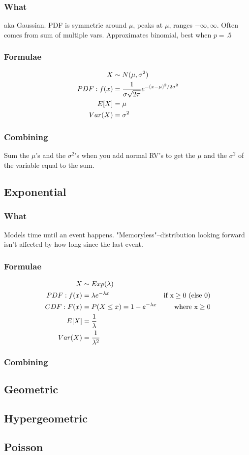 \documentclass[12pt]{amsart}
\begin{document}
\subsubsection{What}
aka Gaussian. PDF is symmetric around $\mu$, peaks at $\mu$, ranges $-\infty, \infty$. Often comes from sum of multiple vars. Approximates binomial, best when $p = .5$
\subsubsection{Formulae}
\begin{align*}
X &\sim N(\mu, \sigma^2) \\
PDF: f(x) &= {1 \over \sigma \sqrt{2\pi}} e^{-(x-\mu)^2 / 2 \sigma^2} \\
E[X] &= \mu \\
Var(X) &= \sigma^2
\end{align*}
\subsubsection{Combining}
Sum the $\mu$'s and the $\sigma^2$'s when you add normal RV's to get the $\mu$ and the $\sigma^2$ of the variable equal to the sum.
%
\subsection{Exponential}
\subsubsection{What}
Models time until an event happens. "Memoryless"--distribution looking forward isn't affected by how long since the last event.
\subsubsection{Formulae}
\begin{align*}
X &\sim Exp(\lambda) \\
PDF: f(x) &= \lambda e^{-\lambda x} & \text{if x} \geq 0 \text{ (else 0)} \\
CDF: F(x) &= P(X \leq x) = 1 - e^{-\lambda x} & \text{where x} \geq 0 \\
E[X] &= {1 \over \lambda} \\
Var(X) &= {1 \over \lambda^2}
\end{align*}
\subsubsection{Combining}
%
\subsection{Geometric}
%
\subsection{Hypergeometric}
%
\subsection{Poisson}
\end{document}
